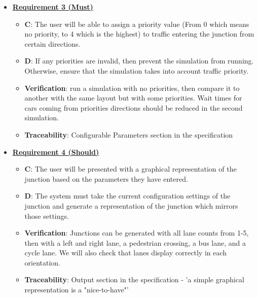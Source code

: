 \documentclass{article}
\begin{document}
\begin{itemize}
    \item \textbf{\underline{Requirement 3 (Must)}}
    \begin{itemize}
        \item \textbf{C}: The user will be able to assign a priority value (From 0 which means 
            no priority, to 4 which is the highest) to traffic entering the junction from certain 
            directions. 
        \item \textbf{D}: If any priorities are invalid, then prevent the simulation from running. 
            Otherwise, ensure that the simulation takes into account traffic priority.
        \item \textbf{Verification}: run a simulation with no priorities, then compare it to another 
            with the same layout but with some priorities. Wait times for cars coming from priorities 
            directions should be reduced in the second simulation.
        \item\textbf{Traceability}: Configurable Parameters section in the specification
    \end{itemize}

    \item \textbf{\underline{Requirement 4 (Should)}}
    \begin{itemize}
        \item \textbf{C}: The user will be presented with a graphical representation of the junction 
        based on the parameters they have entered.
        \item \textbf{D}: The system must take the current configuration settings of the junction and 
        generate a representation of the junction which mirrors those settings. 
        \item \textbf{Verification}: Junctions can be generated with all lane counts from 1-5, then 
        with a left and right lane, a pedestrian crossing, a bus lane, and a cycle lane. We will also check that 
        lanes display correctly in each orientation.
        \item\textbf{Traceability}: Output section in the specification - 'a simple graphical 
        representation is a "nice-to-have"'
    \end{itemize}


\end{itemize}
\end{document}
